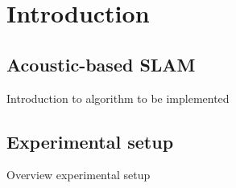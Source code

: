 \section{Introduction}

\subsection{Acoustic-based SLAM}

Introduction to algorithm to be implemented

\subsection{Experimental setup}

Overview experimental setup 
